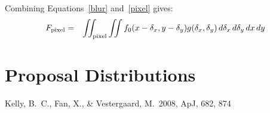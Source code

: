 \documentclass[letterpaper, 11pt]{article}
\begin{document}
Combining Equations~\ref{blur} and~\ref{pixel} gives:
\begin{eqnarray}
F_{\rm{pixel}} &=& \iint_{\rm{pixel}} \iint f_0(x-\delta_x, y-\delta_y)
g(\delta_x, \delta_y) \, d\delta_x \, d\delta_y \,dx\,dy
\end{eqnarray}

\section{Proposal Distributions}



\begin{thebibliography}{99}
 Kelly, B.~C., Fan, X., 
\& Vestergaard, M.\ 2008, ApJ, 682, 874 
\end{thebibliography}
\end{document}
